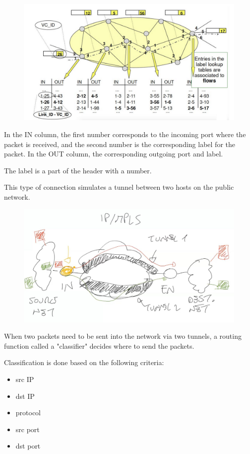 \documentclass[12pt]{article}
\begin{document}
\begin{figure}[ht]
    \includegraphics[scale = 0.3]{connectionOriented.png}
    \centering
\end{figure}

In the IN column, the first number corresponds to the incoming port where the packet is received, and the second number is the corresponding label for the packet. In the OUT column, the corresponding outgoing port and label.

The label is a part of the header with a number.

This type of connection simulates a tunnel between two hosts on the public network.

\begin{figure}[ht]
    \includegraphics[scale = 0.3]{Example2.jpeg}
    \centering
\end{figure}
When two packets need to be sent into the network via two tunnels, a routing function called a "classifier" decides where to send the packets.

\newpage
Classification is done based on the following criteria:
\begin{itemize}
    \item src IP
    \item dst IP
    \item protocol
    \item src port
    \item dst port
\end{itemize}
    
\end{document}
